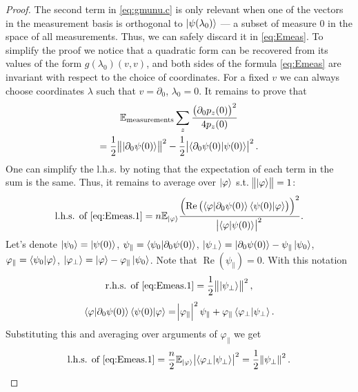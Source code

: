 \documentclass[american,aps,pra,reprint,floatfix,nofootinbib,superscriptaddress]{revtex4-2}
\DeclareMathOperator{\real}{Re}
\begin{document}
\begin{proof}
  The second term in \eqref{eq:gmunu.c} is only relevant when one of the
  vectors in the measurement basis is orthogonal to $\ket{\psi(\lambda_0)}$
  --- a subset of measure $0$ in the space of all measurements. Thus, we can
  safely discard it in \eqref{eq:Emeas}. To simplify the proof we notice that
  a quadratic form can be recovered from its values of the form
  $g(\lambda_0)(v, v)$,
  and both sides of the formula \eqref{eq:Emeas} are
  invariant with respect to the choice of coordinates.
  For a fixed $v$ we can always choose coordinates $\lambda$
  such that $v = \partial_0$, $\lambda_0 = 0$. It remains to prove that
  \begin{multline}
    \label{eq:Emeas.1}
    \mathbb{E}_{\textrm{measurements}}
    \sum_{z}
        \frac{
          \left(\partial_{0} p_z(0)\right)^2
        }{4 p_z(0)} \\
    = \frac12 \norm{\ket{\partial_{0} \psi(0)}}^2
        - \frac12 \abs{\braket{\partial_{0} \psi(0) | \psi(0)}}^2.
  \end{multline}
  One can simplify the l.h.s. by noting that the expectation of each term
  in the sum is the same. Thus, it remains to average over $\ket{\varphi}$
  s.t. $\norm{\ket{\varphi}} = 1$:
  \begin{multline}
    \textrm{l.h.s. of \eqref{eq:Emeas.1}}
    = n\mathbb{E}_{\ket{\varphi}}
      \frac{
        \left(\real\left(
        \braket{\varphi|\partial_{0} \psi(0)}
        \braket{\psi(0)|\varphi}\right)\right)^2
      }{\abs{\braket{\varphi|\psi(0)}}^2}.
  \end{multline}
  Let's denote
    $\ket{\psi_0} = \ket{\psi(0)}$,
    $\psi_\parallel = \braket{\psi_0|\partial_0\psi(0)}$,
    $\ket{\psi_\perp} = \ket{\partial_0\psi(0)} - \psi_\parallel\ket{\psi_0}$,
    $\varphi_\parallel = \braket{\psi_0|\varphi}$,
    $\ket{\varphi_\perp} = \ket{\varphi} - \varphi_\parallel\ket{\psi_0}$.
    Note that $\real(\psi_\parallel) = 0$.  With this notation
  \begin{equation}
    \textrm{r.h.s. of \eqref{eq:Emeas.1}} = \frac12 \norm{\ket{\psi_\perp}}^2,
  \end{equation}
  \begin{equation}
    \braket{\varphi|\partial_{0} \psi(0)} \braket{\psi(0)|\varphi} = 
    \abs{\varphi_\parallel}^2 \psi_\parallel
    + \varphi_\parallel \braket{\varphi_\perp|\psi_\perp}.
  \end{equation}
  Substituting this and averaging over arguments of $\varphi_\parallel$
  we get
  \begin{equation}
    \textrm{l.h.s. of \eqref{eq:Emeas.1}}
    = \frac{n}{2}\mathbb{E}_{\ket{\varphi}}
      \abs{\braket{\varphi_\perp|\psi_\perp}}^2
    = \frac12 \norm{\psi_\perp}^2.
  \end{equation}
\end{proof}
\end{document}
